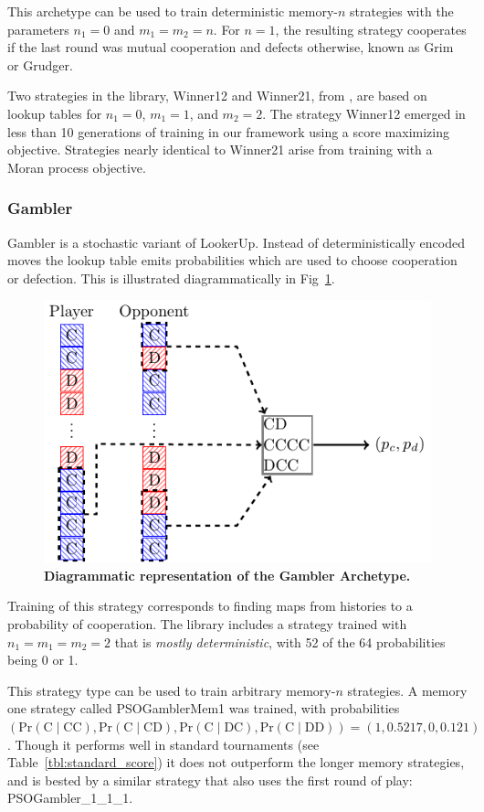 \documentclass[10pt,letterpaper]{article}
\begin{document}
This archetype can be used to train deterministic memory-$n$ strategies with the
parameters $n_1=0$ and $m_1=m_2=n$. For $n=1$, the resulting strategy cooperates
if the last round was mutual cooperation and defects otherwise, known as Grim or
Grudger.

Two strategies in the library, Winner12 and Winner21, from \cite{Mathieu2015},
are based on lookup tables for $n_1 = 0$, $m_1 = 1$, and $m_2=2$. The strategy
Winner12 emerged in less than 10 generations of training in our framework using
a score maximizing objective. Strategies nearly identical to Winner21 arise
from training with a Moran process objective.

\subsubsection*{Gambler}\label{sec:gambler}

Gambler is a stochastic variant of LookerUp. Instead of deterministically
encoded moves the lookup table emits probabilities which are
used to choose cooperation or defection.
This is illustrated diagrammatically in Fig~\ref{fig:gambler}.

\begin{figure}[!hbtp]
    \centering
    \includegraphics[width=.7\textwidth]{gambler.pdf}
    \caption{\bf Diagrammatic representation of the Gambler Archetype.}
    \label{fig:gambler}
\end{figure}

Training of this strategy corresponds to finding maps from histories to
a probability of cooperation. The library includes a strategy trained
with $n_1 = m_1 = m_2 = 2$ that is \emph{mostly deterministic}, with 52 of the 64
probabilities being 0 or 1. 

This strategy type can be used to train arbitrary memory-$n$ strategies. A
memory one strategy called PSOGamblerMem1 was trained, with
probabilities $(\text{Pr}(\text{C}\;|\;\text{CC}),
                \text{Pr}(\text{C}\;|\;\text{CD}),
                \text{Pr}(\text{C}\;|\;\text{DC}),
                \text{Pr}(\text{C}\;|\;\text{DD})) = (1, 0.5217, 0, 0.121)$.
Though it performs well in standard tournaments (see
Table~\ref{tbl:standard_score})
it does not outperform the longer memory strategies, and is bested by a similar
strategy that also uses the first round of play: PSOGambler\_1\_1\_1.
\end{document}
